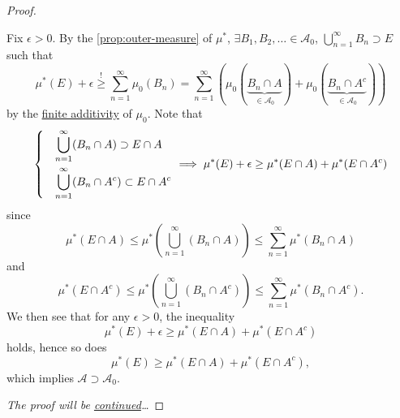 \begin{proof}
\begin{itemize}
		      \par Fix \(\epsilon >0\). By the \autoref{prop:outer-measure} of \(\mu^{*} \), \(\exists B_1, B_2, \ldots \in \mathcal{A}_0\),
		      \(\bigcup\limits_{n=1}^{\infty} B_{n}\supset E\) such that
		      \[
			      \mu^{*} (E) + \epsilon \overset{\hyperref[prop:outer-measure]{!}}{\geq} \sum\limits_{n=1}^{\infty} \mu_0(B_{n}) = \sum\limits_{n=1}^{\infty} \left(\mu_0(\underbrace{B_{n}\cap A}_{\in \mathcal{A} _0}) + \mu_0(\underbrace{B_{n}\cap A^{c}}_{\in \mathcal{A} _0} )\right)
		      \]
		      by the \hyperref[def:pre-measure-finite-additivity]{finite additivity} of \(\mu_0\). Note that
		      \[
			      \begin{dcases}
				       & \bigcup\limits_{n=1}^{\infty} (B_{n}\cap A)      \supset E\cap A     \\
				       & \bigcup\limits_{n=1}^{\infty} (B_{n}\cap A^{c})  \subset E\cap A^{c}
			      \end{dcases}\implies \mu^{*} (E)+\epsilon \geq \mu^{*} (E\cap A) + \mu^{*} (E\cap A^{c} )
		      \]
		      since
		      \[
			      \mu^{*} (E\cap A)\leq \mu^{*} \left(\bigcup\limits_{n=1}^{\infty} (B_{n}\cap A)\right)\leq \sum\limits_{n=1}^{\infty} \mu^{*} (B_{n}\cap A)
		      \]
		      and
		      \[
			      \mu^{*} (E\cap A^{c} )\leq \mu^{*} \left(\bigcup\limits_{n=1}^{\infty} (B_{n}\cap A^{c})\right) \leq \sum\limits_{n=1}^{\infty} \mu^{*} (B_{n}\cap A^{c} ).
		      \]
		      We then see that for any \(\epsilon >0\), the inequality
		      \[
			      \mu^{*} (E)+\epsilon \geq \mu^{*} (E\cap A) + \mu^{*} (E\cap A^{c} )
		      \]
		      holds, hence so does
		      \[
			      \mu^{*} (E) \geq \mu^{*} (E\cap A) + \mu^{*} (E\cap A^{c} ),
		      \]
		      which implies \(\mathcal{A} \supset \mathcal{A} _0\).
	\end{itemize}
	\emph{The proof will be \hyperref[pf:Hahn-Kolmogorov-Thm-cont]{continued}\ldots}
\end{proof}